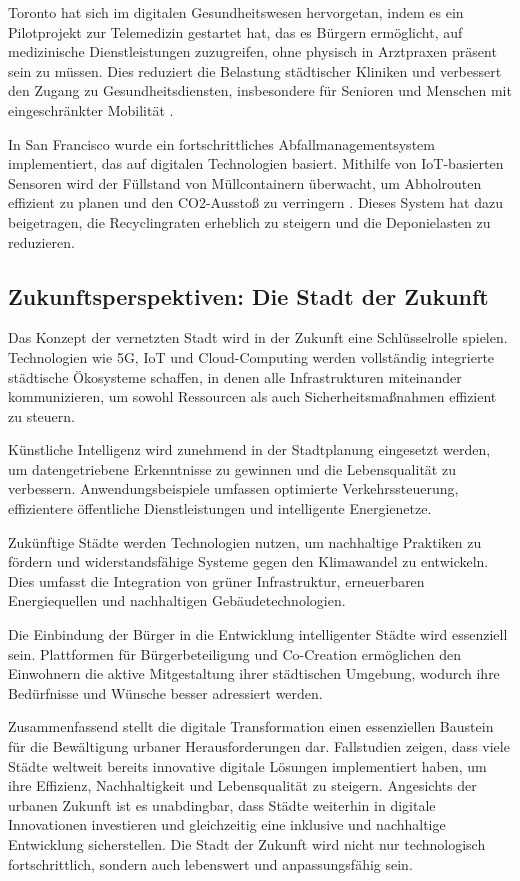 \documentclass[conference,compsoc,final,a4paper, onecolumn, 11pt]{IEEEtran}
\begin{document}
Toronto hat sich im digitalen Gesundheitswesen hervorgetan, indem es ein Pilotprojekt zur Telemedizin gestartet hat, das es Bürgern ermöglicht, auf medizinische Dienstleistungen zuzugreifen, ohne physisch in Arztpraxen präsent sein zu müssen. 
Dies reduziert die Belastung städtischer Kliniken und verbessert den Zugang zu Gesundheitsdiensten, insbesondere für Senioren und Menschen mit eingeschränkter Mobilität \autocite{Doe2022}.

In San Francisco wurde ein fortschrittliches Abfallmanagementsystem implementiert, das auf digitalen Technologien basiert. 
Mithilfe von \ac{IoT}-basierten Sensoren wird der Füllstand von Müllcontainern überwacht, um Abholrouten effizient zu planen und den CO2-Ausstoß zu verringern \autocite{Jones2019}. 
Dieses System hat dazu beigetragen, die Recyclingraten erheblich zu steigern und die Deponielasten zu reduzieren.

\subsection{Zukunftsperspektiven: Die Stadt der Zukunft}
Das Konzept der vernetzten Stadt wird in der Zukunft eine Schlüsselrolle spielen. 
Technologien wie 5G, \ac{IoT} und Cloud-Computing werden vollständig integrierte städtische Ökosysteme schaffen, in denen alle Infrastrukturen miteinander kommunizieren, um sowohl Ressourcen als auch Sicherheitsmaßnahmen effizient zu steuern.

Künstliche Intelligenz wird zunehmend in der Stadtplanung eingesetzt werden, um datengetriebene Erkenntnisse zu gewinnen und die Lebensqualität zu verbessern. 
Anwendungsbeispiele umfassen optimierte Verkehrssteuerung, effizientere öffentliche Dienstleistungen und intelligente Energienetze.

Zukünftige Städte werden Technologien nutzen, um nachhaltige Praktiken zu fördern und widerstandsfähige Systeme gegen den Klimawandel zu entwickeln. 
Dies umfasst die Integration von grüner Infrastruktur, erneuerbaren Energiequellen und nachhaltigen Gebäudetechnologien.

Die Einbindung der Bürger in die Entwicklung intelligenter Städte wird essenziell sein. 
Plattformen für Bürgerbeteiligung und Co-Creation ermöglichen den Einwohnern die aktive Mitgestaltung ihrer städtischen Umgebung, wodurch ihre Bedürfnisse und Wünsche besser adressiert werden.

Zusammenfassend stellt die digitale Transformation einen essenziellen Baustein für die Bewältigung urbaner Herausforderungen dar. 
Fallstudien zeigen, dass viele Städte weltweit bereits innovative digitale Lösungen implementiert haben, um ihre Effizienz, Nachhaltigkeit und Lebensqualität zu steigern. 
Angesichts der urbanen Zukunft ist es unabdingbar, dass Städte weiterhin in digitale Innovationen investieren und gleichzeitig eine inklusive und nachhaltige Entwicklung sicherstellen. 
Die Stadt der Zukunft wird nicht nur technologisch fortschrittlich, sondern auch lebenswert und anpassungsfähig sein.
\end{document}
